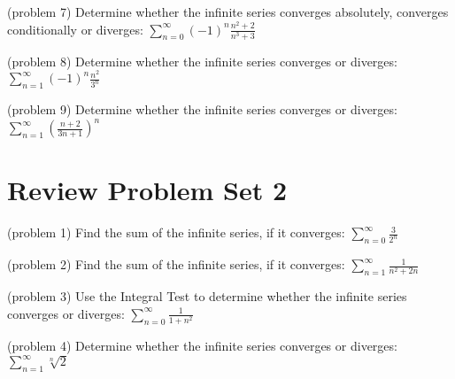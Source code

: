 \documentclass[handout]{ximera}
\begin{document}
\begin{problem}(problem 7)
Determine whether the infinite series converges absolutely, converges conditionally or diverges: $\displaystyle \sum_{n=0}^\infty (-1)^n \frac{n^2 + 2}{n^3 + 3}$

\end{problem}

\begin{problem}(problem 8)
Determine whether the infinite series converges or diverges: $\displaystyle \sum_{n=1}^\infty (-1)^n\frac{n^2}{3^n}$

\end{problem}


\begin{problem}(problem 9)
Determine whether the infinite series converges or diverges: $\displaystyle \sum_{n=1}^\infty \left(\frac{n+ 2}{3n+1}\right)^n$

\end{problem}



\section{Review Problem Set 2}





\begin{problem}(problem 1)
Find the sum of the infinite series, if it converges: $\displaystyle \sum_{n=0}^\infty \frac{3}{2^n}$

\end{problem}


\begin{problem}(problem 2)
Find the sum of the infinite series, if it converges: $\displaystyle \sum_{n=1}^\infty \frac{1}{n^2 + 2n}$

\end{problem}

\begin{problem}(problem 3)
Use the Integral Test to determine whether the infinite series converges or diverges:  $\displaystyle \sum_{n=0}^\infty \frac{1}{1+n^2}$

\end{problem}

\begin{problem}(problem 4)
Determine whether the infinite series converges or diverges: $\displaystyle \sum_{n=1}^\infty \sqrt[n] 2$

\end{problem}
\end{document}
